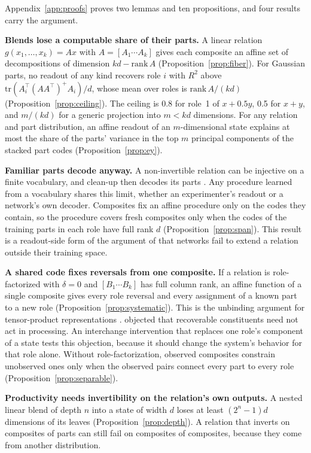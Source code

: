 \documentclass[10pt]{article}
\theoremstyle{plain}
\theoremstyle{remark}
\begin{document}
Appendix~\ref{app:proofs} proves two lemmas and ten propositions, and four results carry the argument.

\textbf{Blends lose a computable share of their parts.} A linear relation $g(x_1, \ldots, x_k) = A x$ with $A = [A_1 \cdots A_k]$ gives each composite an affine set of decompositions of dimension $kd - \mathrm{rank}\,A$ (Proposition~\ref{prop:fiber}). For Gaussian parts, no readout of any kind recovers role $i$ with $R^2$ above $\mathrm{tr}(A_i^{\top}(AA^{\top})^{+}A_i)/d$, whose mean over roles is $\mathrm{rank}\,A/(kd)$ (Proposition~\ref{prop:ceiling}). The ceiling is 0.8 for role~1 of $x + 0.5y$, 0.5 for $x + y$, and $m/(kd)$ for a generic projection into $m < kd$ dimensions. For any relation and part distribution, an affine readout of an $m$-dimensional state explains at most the share of the parts' variance in the top $m$ principal components of the stacked part codes (Proposition~\ref{prop:ey}).

\textbf{Familiar parts decode anyway.} A non-invertible relation can be injective on a finite vocabulary, and clean-up then decodes its parts \citep{plate2003,frady2018}. Any procedure learned from a vocabulary shares this limit, whether an experimenter's readout or a network's own decoder. Composites fix an affine procedure only on the codes they contain, so the procedure covers fresh composites only when the codes of the training parts in each role have full rank $d$ (Proposition~\ref{prop:span}). This result is a readout-side form of the argument of \citet{marcus1998} that networks fail to extend a relation outside their training space.

\textbf{A shared code fixes reversals from one composite.} If a relation is role-factorized with $\delta = 0$ and $[B_1 \cdots B_k]$ has full column rank, an affine function of a single composite gives every role reversal and every assignment of a known part to a new role (Proposition~\ref{prop:systematic}). This is the unbinding argument for tensor-product representations \citep{smolensky1990}. \citet{fodor1990} objected that recoverable constituents need not act in processing. An interchange intervention that replaces one role's component of a state tests this objection, because it should change the system's behavior for that role alone. Without role-factorization, observed composites constrain unobserved ones only when the observed pairs connect every part to every role (Proposition~\ref{prop:separable}).

\textbf{Productivity needs invertibility on the relation's own outputs.} A nested linear blend of depth $n$ into a state of width $d$ loses at least $(2^n - 1)d$ dimensions of its leaves (Proposition~\ref{prop:depth}). A relation that inverts on composites of parts can still fail on composites of composites, because they come from another distribution.
\end{document}
